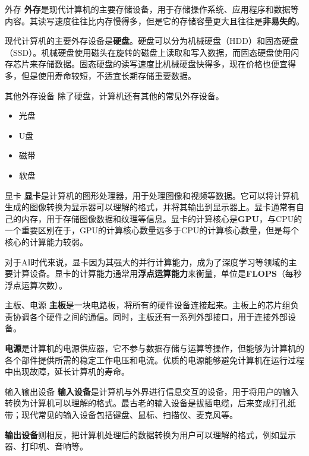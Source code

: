 \documentclass{beamer}
\begin{document}
\begin{frame}{外存}
    \textbf{外存}是现代计算机的主要存储设备，用于存储操作系统、应用程序和数据等内容。其读写速度往往比内存慢得多，但是它的存储容量更大且往往是\textbf{非易失的}。

    现代计算机的主要外存设备是\textbf{硬盘}。硬盘可以分为机械硬盘（HDD）和固态硬盘（SSD）。机械硬盘使用磁头在旋转的磁盘上读取和写入数据，而固态硬盘使用闪存芯片来存储数据。固态硬盘的读写速度比机械硬盘快得多，现在价格也便宜得多，但是使用寿命较短，不适宜长期存储重要数据。
\end{frame}

\begin{frame}{其他外存设备}
    除了硬盘，计算机还有其他的常见外存设备。

    \begin{itemize}
        \item 光盘
        \item U盘
        \item 磁带
        \item 软盘
    \end{itemize}
\end{frame}

\begin{frame}{显卡}
    \textbf{显卡}是计算机的图形处理器，用于处理图像和视频等数据。它可以将计算机生成的图像转换为显示器可以理解的格式，并将其输出到显示器上。显卡通常有自己的内存，用于存储图像数据和纹理等信息。显卡的计算核心是\textbf{GPU}，与CPU的一个重要区别在于，GPU的计算核心数量远多于CPU的计算核心数量，但是每个核心的计算能力较弱。

    对于AI时代来说，显卡因为其强大的并行计算能力，成为了深度学习等领域的主要计算设备。显卡的计算能力通常用\textbf{浮点运算能力}来衡量，单位是\textbf{FLOPS}（每秒浮点运算次数）。
\end{frame}

\begin{frame}{主板、电源}
    \textbf{主板}是一块电路板，将所有的硬件设备连接起来。主板上的芯片组负责协调各个硬件之间的通信。同时，主板还有一系列外部接口，用于连接外部设备。

    \textbf{电源}是计算机的电源供应器，它不参与数据存储与运算等操作，但能够为计算机的各个部件提供所需的稳定工作电压和电流。优质的电源能够避免计算机在运行过程中出现故障，延长计算机的寿命。
\end{frame}

\begin{frame}{输入输出设备}
    \textbf{输入设备}是计算机与外界进行信息交互的设备，用于将用户的输入转换为计算机可以理解的格式。最古老的输入设备是拔插电缆，后来变成打孔纸带；现代常见的输入设备包括键盘、鼠标、扫描仪、麦克风等。
    
    \textbf{输出设备}则相反，把计算机处理后的数据转换为用户可以理解的格式，例如显示器、打印机、音响等。
\end{frame}
\end{document}
